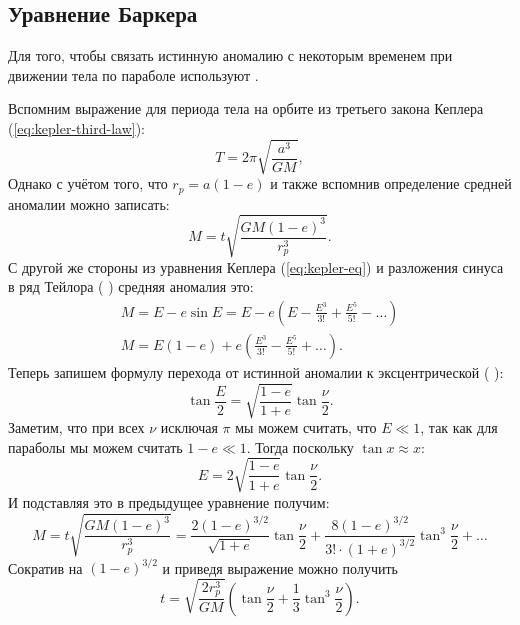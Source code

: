 \subsection{Уравнение Баркера}
Для того, чтобы связать истинную аномалию с некоторым временем при движении тела по параболе используют .

Вспомним выражение для периода тела на орбите из третьего закона Кеплера (\ref{eq:kepler-third-law}):
\begin{equation*}
	T = 2\pi \sqrt{\frac{a^3}{GM}},
\end{equation*}
Однако с учётом того, что $r_{p} = a(1-e)$ и также вспомнив определение средней аномалии можно записать:
\begin{equation*}
	M=t \sqrt{\frac{GM(1-e)^3}{r_{p}^3}}.
\end{equation*}
С другой же стороны из уравнения Кеплера (\ref{eq:kepler-eq}) и разложения синуса в ряд Тейлора (%
) средняя аномалия это:
\begin{gather*}
	M=E - e \sin E = E - e \left(E - \frac{E^3}{3!} + \frac{E^5}{5!} - \dots\right) \\
	M = E(1-e) + e\left(\frac{E^3}{3!} - \frac{E^5}{5!} + \dots \right).
\end{gather*}
Теперь запишем формулу перехода от истинной аномалии к эксцентрической (%
):
\begin{equation*}
	\tan \frac{E}{2} = \sqrt{\frac{1-e}{1+e}} \tan \frac{\nu}{2}.
\end{equation*}
Заметим, что при всех $\nu$ исключая $\pi$ мы можем считать, что $E \ll 1$, так как для параболы мы можем считать $1-e \ll 1$. Тогда поскольку $\tan x \approx x$:
\begin{equation*}
	E = 2 \sqrt{\frac{1-e}{1+e}} \tan \frac{\nu}{2}.
\end{equation*}
И подставляя это в предыдущее уравнение получим:
\begin{equation*}
	M = t \sqrt{\frac{GM(1-e)^3}{r_{p}^3}} = \frac{2(1-e)^{3/2}}{\sqrt{1+e}}\tan\frac{\nu}{2} + \frac{8(1-e)^{3/2}}{3! \cdot (1+e)^{3/2}}\tan^3 \frac{\nu}{2} + \dots
\end{equation*}
Сократив на $(1-e)^{3/2}$ и приведя выражение можно получить 
\begin{equation}
	t = \sqrt{\frac{2r_{p}^3}{GM}}\left(\tan \frac{\nu}{2 } + \frac{1}{3}\tan^3 \frac{\nu}{2}\right).
\end{equation}